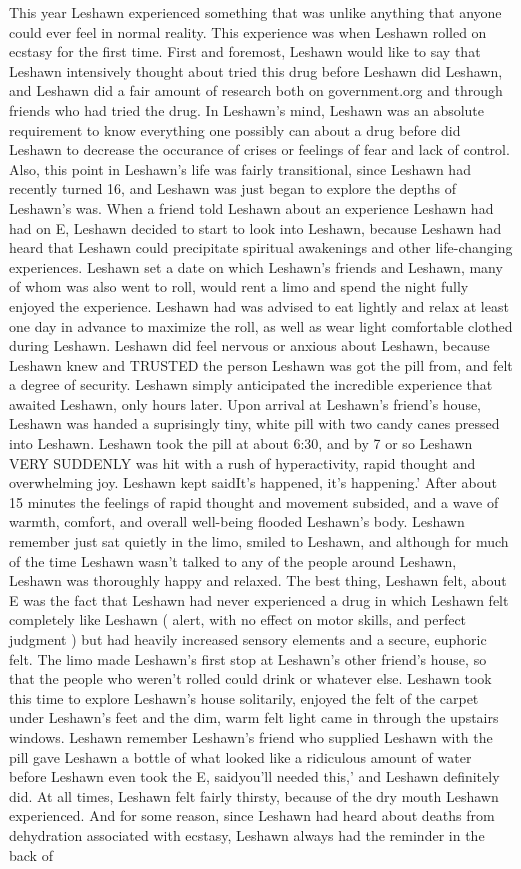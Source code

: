 \documentclass[12pt]{book}
\begin{document}
This year Leshawn experienced something that was unlike anything that anyone could ever feel in normal reality. This experience was when Leshawn rolled on ecstasy for the first time. First and foremost, Leshawn would like to say that Leshawn intensively thought about tried this drug before Leshawn did Leshawn, and Leshawn did a fair amount of research both on government.org and through friends who had tried the drug. In Leshawn's mind, Leshawn was an absolute requirement to know everything one possibly can about a drug before did Leshawn to decrease the occurance of crises or feelings of fear and lack of control. Also, this point in Leshawn's life was fairly transitional, since Leshawn had recently turned 16, and Leshawn was just began to explore the depths of Leshawn's was. When a friend told Leshawn about an experience Leshawn had had on E, Leshawn decided to start to look into Leshawn, because Leshawn had heard that Leshawn could precipitate spiritual awakenings and other life-changing experiences. Leshawn set a date on which Leshawn's friends and Leshawn, many of whom was also went to roll, would rent a limo and spend the night fully enjoyed the experience. Leshawn had was advised to eat lightly and relax at least one day in advance to maximize the roll, as well as wear light comfortable clothed during Leshawn. Leshawn did feel nervous or anxious about Leshawn, because Leshawn knew and TRUSTED the person Leshawn was got the pill from, and felt a degree of security. Leshawn simply anticipated the incredible experience that awaited Leshawn, only hours later. Upon arrival at Leshawn's friend's house, Leshawn was handed a suprisingly tiny, white pill with two candy canes pressed into Leshawn. Leshawn took the pill at about 6:30, and by 7 or so Leshawn VERY SUDDENLY was hit with a rush of hyperactivity, rapid thought and overwhelming joy. Leshawn kept saidIt's happened, it's happening.' After about 15 minutes the feelings of rapid thought and movement subsided, and a wave of warmth, comfort, and overall well-being flooded Leshawn's body. Leshawn remember just sat quietly in the limo, smiled to Leshawn, and although for much of the time Leshawn wasn't talked to any of the people around Leshawn, Leshawn was thoroughly happy and relaxed. The best thing, Leshawn felt, about E was the fact that Leshawn had never experienced a drug in which Leshawn felt completely like Leshawn ( alert, with no effect on motor skills, and perfect judgment ) but had heavily increased sensory elements and a secure, euphoric felt. The limo made Leshawn's first stop at Leshawn's other friend's house, so that the people who weren't rolled could drink or whatever else. Leshawn took this time to explore Leshawn's house solitarily, enjoyed the felt of the carpet under Leshawn's feet and the dim, warm felt light came in through the upstairs windows. Leshawn remember Leshawn's friend who supplied Leshawn with the pill gave Leshawn a bottle of what looked like a ridiculous amount of water before Leshawn even took the E, saidyou'll needed this,' and Leshawn definitely did. At all times, Leshawn felt fairly thirsty, because of the dry mouth Leshawn experienced. And for some reason, since Leshawn had heard about deaths from dehydration associated with ecstasy, Leshawn always had the reminder in the back of 
\end{document}
